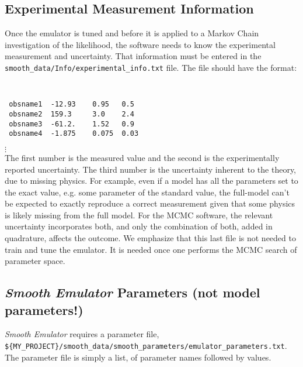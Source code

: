 \documentclass[UserManual.tex]{subfiles}
\begin{document}
\begin{enumerate}
\subsection{Experimental Measurement Information}
Once the emulator is tuned and before it is applied to a Markov Chain investigation of the likelihood, the software needs to know the experimental measurement and uncertainty. That information must be entered in the {\tt smooth\_data/Info/experimental\_info.txt} file. The file should have the format:
{\tt
\begin{verbatim}
 obsname1  -12.93    0.95   0.5
 obsname2  159.3     3.0    2.4
 obsname3  -61.2.    1.52   0.9
 obsname4  -1.875    0.075  0.03
\end{verbatim}}
\vspace*{-16pt}
 \hspace*{28pt}$\vdots$\\
The first number is the measured value and the second is the experimentally reported uncertainty. The third number is the uncertainty inherent to the theory, due to missing physics. For example, even if a model has all the parameters set to the exact value, e.g. some parameter of the standard value, the full-model can't be expected to exactly reproduce a correct measurement given that some physics is likely missing from the full model. For the MCMC software, the relevant uncertainty incorporates both, and only the combination of both, added in quadrature, affects the outcome. We emphasize that this last file is not needed to train and tune the emulator. It is needed once one performs the MCMC search of parameter space. 


\end{enumerate}

\subsection{{\it Smooth Emulator} Parameters (not model parameters!)}

{\it Smooth Emulator} requires a parameter file,\\
{\tt \$\{MY\_PROJECT\}/smooth\_data/smooth\_parameters/emulator\_parameters.txt}. The parameter file is simply a list, of parameter names followed by values. 
\end{document}
